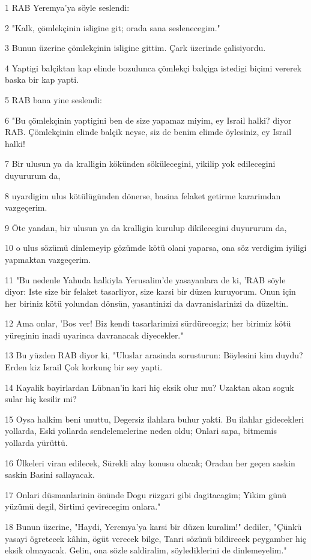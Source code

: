 \par 1 RAB Yeremya'ya söyle seslendi:
\par 2 "Kalk, çömlekçinin isligine git; orada sana seslenecegim."
\par 3 Bunun üzerine çömlekçinin isligine gittim. Çark üzerinde çalisiyordu.
\par 4 Yaptigi balçiktan kap elinde bozulunca çömlekçi balçiga istedigi biçimi vererek baska bir kap yapti.
\par 5 RAB bana yine seslendi:
\par 6 "Bu çömlekçinin yaptigini ben de size yapamaz miyim, ey Israil halki? diyor RAB. Çömlekçinin elinde balçik neyse, siz de benim elimde öylesiniz, ey Israil halki!
\par 7 Bir ulusun ya da kralligin kökünden sökülecegini, yikilip yok edilecegini duyururum da,
\par 8 uyardigim ulus kötülügünden dönerse, basina felaket getirme kararimdan vazgeçerim.
\par 9 Öte yandan, bir ulusun ya da kralligin kurulup dikilecegini duyururum da,
\par 10 o ulus sözümü dinlemeyip gözümde kötü olani yaparsa, ona söz verdigim iyiligi yapmaktan vazgeçerim.
\par 11 "Bu nedenle Yahuda halkiyla Yerusalim'de yasayanlara de ki, 'RAB söyle diyor: Iste size bir felaket tasarliyor, size karsi bir düzen kuruyorum. Onun için her biriniz kötü yolundan dönsün, yasantinizi da davranislarinizi da düzeltin.
\par 12 Ama onlar, 'Bos ver! Biz kendi tasarlarimizi sürdürecegiz; her birimiz kötü yüreginin inadi uyarinca davranacak diyecekler."
\par 13 Bu yüzden RAB diyor ki, "Uluslar arasinda sorusturun: Böylesini kim duydu? Erden kiz Israil Çok korkunç bir sey yapti.
\par 14 Kayalik bayirlardan Lübnan'in kari hiç eksik olur mu? Uzaktan akan soguk sular hiç kesilir mi?
\par 15 Oysa halkim beni unuttu, Degersiz ilahlara buhur yakti. Bu ilahlar gidecekleri yollarda, Eski yollarda sendelemelerine neden oldu; Onlari sapa, bitmemis yollarda yürüttü.
\par 16 Ülkeleri viran edilecek, Sürekli alay konusu olacak; Oradan her geçen saskin saskin Basini sallayacak.
\par 17 Onlari düsmanlarinin önünde Dogu rüzgari gibi dagitacagim; Yikim günü yüzümü degil, Sirtimi çevirecegim onlara."
\par 18 Bunun üzerine, "Haydi, Yeremya'ya karsi bir düzen kuralim!" dediler, "Çünkü yasayi ögretecek kâhin, ögüt verecek bilge, Tanri sözünü bildirecek peygamber hiç eksik olmayacak. Gelin, ona sözle saldiralim, söylediklerini de dinlemeyelim."

